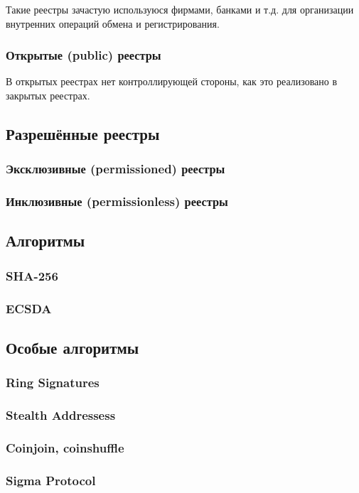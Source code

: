 Такие реестры зачастую используюся фирмами, банками и т.д. для организации
внутренних операций обмена и регистрирования.

\subsubsection{Открытые (public) реестры}
В открытых реестрах нет контроллирующей стороны, как это реализовано в закрытых реестрах.

\subsection{Разрешённые реестры}
\subsubsection{Эксклюзивные (permissioned) реестры}
\subsubsection{Инклюзивные (permissionless) реестры}


\subsection{Алгоритмы}
\subsubsection{SHA-256}
\subsubsection{ECSDA}


\subsection{Особые алгоритмы}
\subsubsection{Ring Signatures}
\subsubsection{Stealth Addressess}
\subsubsection{Coinjoin, coinshuffle}
\subsubsection{Sigma Protocol}
